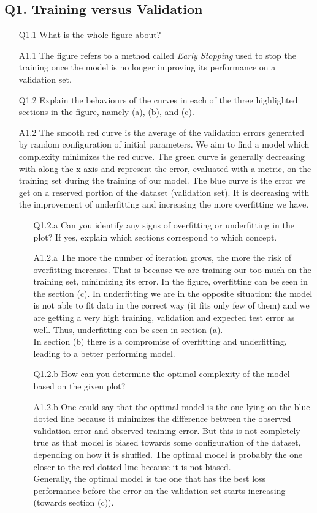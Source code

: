 \documentclass[11pt]{scrartcl}
\begin{document}
\subsection*{Q1. Training versus Validation}
\begin{itemize}
\item[Q1.1] What is the whole figure about?  
\item[A1.1] The figure refers to a method called \textit{Early Stopping} used to stop the training once the model is no longer improving its performance on a validation set.
\item[Q1.2] Explain the behaviours of the curves in each of the three highlighted sections in the figure, namely (a), (b), and (c).   
\item[A1.2] The smooth red curve is the average of the validation errors generated by random configuration of initial parameters. We aim to find a model which complexity minimizes the red curve. The green curve is generally decreasing with along the x-axis and represent the error, evaluated with a metric, on the training set during the training of our model. The blue curve is the error we get on a reserved portion of the dataset (validation set). It is decreasing with the improvement of underfitting and increasing the more overfitting we have. 

\begin{itemize}
\item[Q1.2.a] Can you identify any signs of overfitting or underfitting in the plot? If yes, explain which sections correspond to which concept.
\item[A1.2.a] The more the number of iteration grows, the more the risk of overfitting increases. That is because we are training our too much on the training set, minimizing its error. In the figure, overfitting can be seen in the section (c). In underfitting we are in the opposite situation: the model is not able to fit data in the correct way (it fits only few of them) and we are getting a very high training, validation and expected test error as well. Thus, underfitting can be seen in section (a).\\
In section (b) there is a compromise of overfitting and underfitting, leading to a better performing model.

\item[Q1.2.b] How can you determine the optimal complexity of the model based on the given plot?
\item[A1.2.b] One could say that the optimal model is the one lying on the blue dotted line because it minimizes the difference between the observed validation error and observed training error. But this is not completely true as that model is biased towards some configuration of the dataset, depending on how it is shuffled. The optimal model is probably the one closer to the red dotted line because it is not biased. \\
Generally, the optimal model is the one that has the best loss performance before the error on the validation set starts increasing (towards section (c)).
\end{itemize}
	

\end{itemize}
\end{document}
